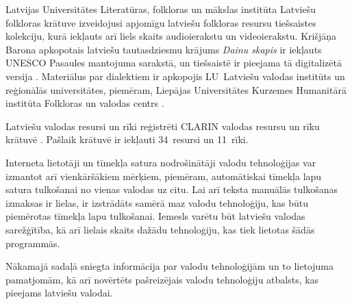 \begin{multicols}{2}
Latvijas Universitātes Literatūras, folkloras un mākslas institūta Latviešu folkloras krātuve \cite{Meta11} izveidojusi apjomīgu latviešu folkloras resursu tiešsaistes kolekciju, kurā iekļauts arī liels skaits audioierakstu un videoierakstu. 
Krišjāņa Barona apkopotais latviešu tautasdziesmu krājums \textit{Dainu skapis} ir iekļauts UNESCO Pasaules mantojuma sarakstā, un tiešsaistē ir pieejama tā digitalizētā versija \cite{Meta12}. 
Materiālus par dialektiem ir apkopojis LU~Latviešu valodas institūts un reģionālās universitātes, piemēram, Liepājas Universitātes Kurzemes Humanitārā institūta Folkloras un valodas centrs \cite{Meta13}.

Latviešu valodas resursi un rīki reģistrēti CLARIN valodas resursu un rīku krātuvē \cite{Meta14}.
Pašlaik krātuvē ir iekļauti 34~resursi un 11~rīki.

Interneta lietotāji un tīmekļa satura nodrošinātāji valodu tehnoloģijas var izmantot arī vienkāršākiem mērķiem, piemēram, automātiskai tīmekļa lapu satura tulkošanai no vienas valodas uz citu.
Lai arī teksta manuālās tulkošanas izmaksas ir lielas, ir izstrādāts samērā maz valodu tehnoloģiju, kas būtu piemērotas tīmekļa lapu tulkošanai.
Iemesls varētu būt latviešu valodas sarežģītība, kā arī lielais skaits dažādu tehnoloģiju, kas tiek lietotas šādās programmās.

Nākamajā sadaļā sniegta informācija par valodu tehnoloģijām un to lietojuma pamatjomām, kā arī novērtēts pašreizējais valodu tehnoloģiju atbalsts, kas pieejams latviešu valodai. 
\end{multicols}

\clearpage



